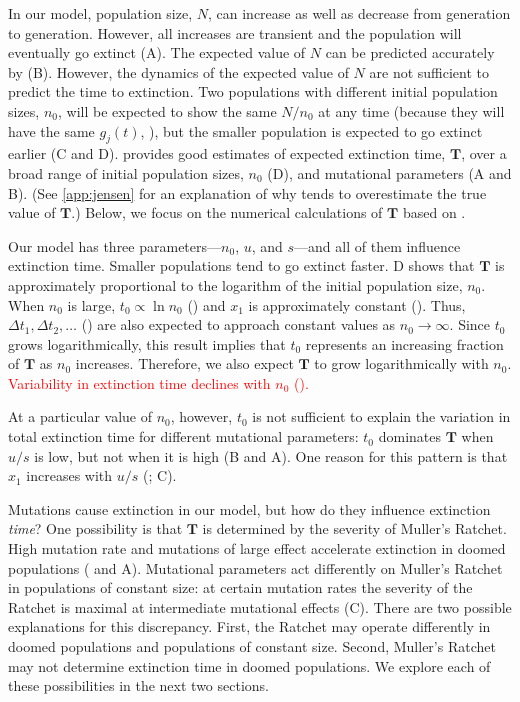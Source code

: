 \documentclass[9pt,lineno]{elife}
\newcommand{\red}{\textcolor{red}}
\begin{document}
In our model, population size, $N$, can increase as well as decrease from generation to generation.  However, all increases are transient and the population will eventually go extinct (A).  The expected value of $N$ can be predicted accurately by  (B).  However, the dynamics of the expected value of $N$ are not sufficient to predict the time to extinction.  Two populations with different initial population sizes, $n_0$, will be expected to show the same $N/n_0$ at any time (because they will have the same $g_j(t)$, ), but the smaller population is expected to go extinct earlier (C and D).   provides good estimates of expected extinction time, $\mathbf{T}$, over a broad range of initial population sizes, $n_0$ (D), and mutational parameters (A and B).  
(See \autoref{app:jensen} for an explanation of why  tends to overestimate the true value of $\mathbf{T}$.)  
Below, we focus on the numerical calculations of $\mathbf{T}$ based on .

Our model has three parameters---$n_0$, $u$, and $s$---and all of them influence extinction time.  Smaller populations tend to go extinct faster.  D shows that $\mathbf{T}$ is approximately proportional to the logarithm of the initial population size, $n_0$.  
%
When $n_0$ is large, $t_0 \propto \ln n_0$ () and $x_1$ is approximately constant ().
Thus, 
$\Delta t_1, \Delta t_2, \ldots$ ()
are also expected to approach constant values as $n_0\to\infty$.  Since
$t_0$ grows logarithmically, this result implies that $t_0$ represents an increasing fraction of $\mathbf{T}$ as $n_0$ increases. 
Therefore, we also expect $\mathbf{T}$ to grow logarithmically with $n_0$. 
\red{Variability in extinction time declines with $n_0$ ().}

At a particular value of $n_0$, however, $t_0$ is not sufficient to explain the variation in total extinction time for different mutational parameters: 
$t_0$ dominates $\mathbf{T}$ when $u/s$ is low, but not when it is high (B and A).  One reason for this pattern is that $x_1$ increases with $u/s$ (; C).

Mutations cause extinction in our model, but how do they influence extinction \textit{time}?  
%
One possibility is that $\mathbf{T}$ is determined by the severity of Muller's Ratchet. High mutation rate and mutations of large effect accelerate extinction in doomed populations ( and A).  Mutational parameters act differently on Muller's Ratchet in populations of constant size: at certain mutation rates the severity of the Ratchet is maximal at intermediate mutational effects \citep{Gabriel_MULLER_1993, Gordo_On_2000, gor00b} (C).
%
There are two possible explanations for this discrepancy.  
%
First, the Ratchet may operate differently in doomed populations and populations of constant size. 
%
Second, Muller's Ratchet may not determine extinction time in doomed populations.  
%
We explore each of these possibilities in the next two sections.  
\end{document}

